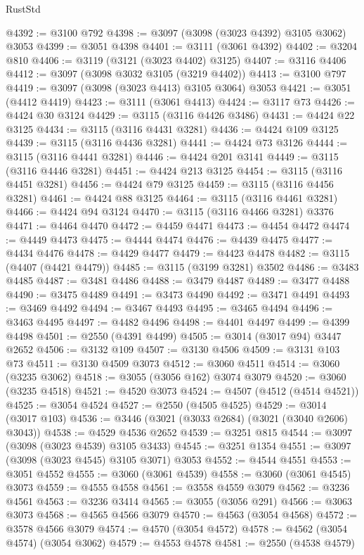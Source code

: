 \begin{lexlean}{RustStd}
\begin{coremodule}
@4392 := @3100 @792
@4398 := @3097 (@3098 (@3023 @4392) @3105 @3062) @3053
@4399 := @3051 @4398
@4401 := @3111 (@3061 @4392)
@4402 := @3204 @810
@4406 := @3119 (@3121 (@3023 @4402) @3125)
@4407 := @3116 @4406
@4412 := @3097 (@3098 @3032 @3105 (@3219 @4402))
@4413 := @3100 @797
@4419 := @3097 (@3098 (@3023 @4413) @3105 @3064) @3053
@4421 := @3051 (@4412 @4419)
@4423 := @3111 (@3061 @4413)
@4424 := @3117 @73
@4426 := @4424 @30 @3124
@4429 := @3115 (@3116 @4426 @3486)
@4431 := @4424 @22 @3125
@4434 := @3115 (@3116 @4431 @3281)
@4436 := @4424 @109 @3125
@4439 := @3115 (@3116 @4436 @3281)
@4441 := @4424 @73 @3126
@4444 := @3115 (@3116 @4441 @3281)
@4446 := @4424 @201 @3141
@4449 := @3115 (@3116 @4446 @3281)
@4451 := @4424 @213 @3125
@4454 := @3115 (@3116 @4451 @3281)
@4456 := @4424 @79 @3125
@4459 := @3115 (@3116 @4456 @3281)
@4461 := @4424 @88 @3125
@4464 := @3115 (@3116 @4461 @3281)
@4466 := @4424 @94 @3124
@4470 := @3115 (@3116 @4466 @3281) @3376
@4471 := @4464 @4470
@4472 := @4459 @4471
@4473 := @4454 @4472
@4474 := @4449 @4473
@4475 := @4444 @4474
@4476 := @4439 @4475
@4477 := @4434 @4476
@4478 := @4429 @4477
@4479 := @4423 @4478
@4482 := @3115 (@4407 (@4421 @4479))
@4485 := @3115 (@3199 @3281) @3502
@4486 := @3483 @4485
@4487 := @3481 @4486
@4488 := @3479 @4487
@4489 := @3477 @4488
@4490 := @3475 @4489
@4491 := @3473 @4490
@4492 := @3471 @4491
@4493 := @3469 @4492
@4494 := @3467 @4493
@4495 := @3465 @4494
@4496 := @3463 @4495
@4497 := @4482 @4496
@4498 := @4401 @4497
@4499 := @4399 @4498
@4501 := @2550 (@4391 @4499)
@4505 := @3014 (@3017 @94) @3447 @2652
@4506 := @3132 @109
@4507 := @3130 @4506
@4509 := @3131 @103 @73
@4511 := @3130 @4509 @3073
@4512 := @3060 @4511
@4514 := @3060 (@3235 @3062)
@4518 := @3055 (@3056 @162) @3074 @3079
@4520 := @3060 (@3235 @4518)
@4521 := @4520 @3073
@4524 := @4507 (@4512 (@4514 @4521))
@4525 := @3054 @4524
@4527 := @2550 (@4505 @4525)
@4529 := @3014 (@3017 @103)
@4536 := @3446 (@3021 (@3033 @2684) (@3021 (@3040 @2606) @3043))
@4538 := @4529 @4536 @2652
@4539 := @3251 @815
@4544 := @3097 (@3098 (@3023 @4539) @3105 @3433)
@4545 := @3251 @1354
@4551 := @3097 (@3098 (@3023 @4545) @3105 @3071) @3053
@4552 := @4544 @4551
@4553 := @3051 @4552
@4555 := @3060 (@3061 @4539)
@4558 := @3060 (@3061 @4545) @3073
@4559 := @4555 @4558
@4561 := @3558 @4559 @3079
@4562 := @3236 @4561
@4563 := @3236 @3414
@4565 := @3055 (@3056 @291)
@4566 := @3063 @3073
@4568 := @4565 @4566 @3079
@4570 := @4563 (@3054 @4568)
@4572 := @3578 @4566 @3079
@4574 := @4570 (@3054 @4572)
@4578 := @4562 (@3054 @4574) (@3054 @3062)
@4579 := @4553 @4578
@4581 := @2550 (@4538 @4579)

\end{coremodule}
\end{lexlean}
